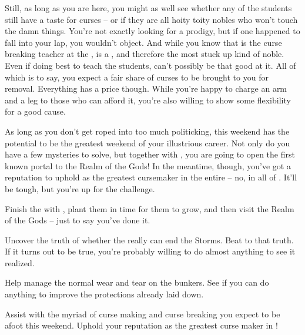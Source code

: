 \documentclass[char]{GL2020}
\begin{document}
Still, as long as you are here, you might as well see whether any of the students still have a taste for curses -- or if they are all hoity toity nobles who won’t touch the damn things. You’re not exactly looking for a prodigy, but if one happened to fall into your lap, you wouldn’t object. And while you know that \cPrince{} is the curse breaking teacher at the \pSc{}, \cPrince{} is a \cPrince{\heir}, and therefore the most stuck up kind of noble. Even if \cPrince{\they} \cPrince{\were} doing \cPrince{\their} best to teach the students, \cPrince{} can’t possibly be that good at it. All of which is to say, you expect a fair share of curses to be brought to you for removal. Everything has a price though. While you’re happy to charge an arm and a leg to those who can afford it, you’re also willing to show some flexibility for a good cause.

As long as you don’t get roped into too much politicking, this weekend has the potential to be the greatest weekend of your illustrious career. Not only do you have a few mysteries to solve, but together with \cFlowPriest{}, you are going to open the first known portal to the Realm of the Gods! In the meantime, though, you’ve got a reputation to uphold as the greatest cursemaker in the entire \pFarm{} -- no, in all of \pEarth{}. It’ll be tough, but you’re up for the challenge.

\begin{itemz}[Goals]
	\item Finish the \iBeans{} with \cFlowPriest{}, plant them in time for them to grow, and then visit the Realm of the Gods -- just to say you’ve done it.
	\item Uncover the truth of whether the \pTech{} really can end the Storms. Beat \cHedonist{} to that truth. If it turns out to be true, you’re probably willing to do almost anything to see it realized.
	\item Help \cBunker{} manage the normal wear and tear on the bunkers. See if you can do anything to improve the protections already laid down.
	\item Assist with the myriad of curse making and curse breaking you expect to be afoot this weekend. Uphold your reputation as the greatest curse maker in \pEarth{}!
\end{itemz}

\begin{itemz}[Notes]
	\item 
\end{itemz}
\end{document}
